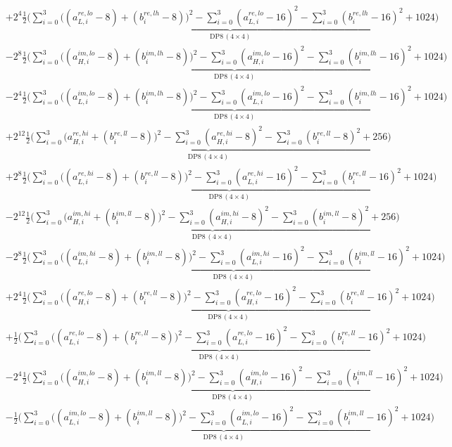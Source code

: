 \documentclass[fleqn]{article}
\newcommand{\DPop}[3]{\mathrm{DP#1}\,(#2\!\times\!#3)}
\begin{document}
\begin{align*}
  & + 2^{4}\underbrace{\tfrac12\Big(\sum_{i=0}^{3}\big((a_{L,i}^{re,lo}{-}8){+}(b_i^{re,lh}{-}8)\big)^2 - \sum_{i=0}^{3}(a_{L,i}^{re,lo}{-}16)^2 - \sum_{i=0}^{3}(b_i^{re,lh}{-}16)^2 + 1024\Big)}_{\DPop{8}{4}{4}} \\[0.35em]
  & - 2^{8}\underbrace{\tfrac12\Big(\sum_{i=0}^{3}\big((a_{H,i}^{im,lo}{-}8){+}(b_i^{im,lh}{-}8)\big)^2 - \sum_{i=0}^{3}(a_{H,i}^{im,lo}{-}16)^2 - \sum_{i=0}^{3}(b_i^{im,lh}{-}16)^2 + 1024\Big)}_{\DPop{8}{4}{4}} \\[0.35em]
  & - 2^{4}\underbrace{\tfrac12\Big(\sum_{i=0}^{3}\big((a_{L,i}^{im,lo}{-}8){+}(b_i^{im,lh}{-}8)\big)^2 - \sum_{i=0}^{3}(a_{L,i}^{im,lo}{-}16)^2 - \sum_{i=0}^{3}(b_i^{im,lh}{-}16)^2 + 1024\Big)}_{\DPop{8}{4}{4}} \\[0.35em]
  & + 2^{12}\underbrace{\tfrac12\Big(\sum_{i=0}^{3}\big(a_{H,i}^{re,hi}{+}(b_i^{re,ll}{-}8)\big)^2 - \sum_{i=0}^{3}(a_{H,i}^{re,hi}{-}8)^2 - \sum_{i=0}^{3}(b_i^{re,ll}{-}8)^2 + 256\Big)}_{\DPop{8}{4}{4}} \\[0.35em]
  & + 2^{8}\underbrace{\tfrac12\Big(\sum_{i=0}^{3}\big((a_{L,i}^{re,hi}{-}8){+}(b_i^{re,ll}{-}8)\big)^2 - \sum_{i=0}^{3}(a_{L,i}^{re,hi}{-}16)^2 - \sum_{i=0}^{3}(b_i^{re,ll}{-}16)^2 + 1024\Big)}_{\DPop{8}{4}{4}} \\[0.35em]
  & - 2^{12}\underbrace{\tfrac12\Big(\sum_{i=0}^{3}\big(a_{H,i}^{im,hi}{+}(b_i^{im,ll}{-}8)\big)^2 - \sum_{i=0}^{3}(a_{H,i}^{im,hi}{-}8)^2 - \sum_{i=0}^{3}(b_i^{im,ll}{-}8)^2 + 256\Big)}_{\DPop{8}{4}{4}} \\[0.35em]
  & - 2^{8}\underbrace{\tfrac12\Big(\sum_{i=0}^{3}\big((a_{L,i}^{im,hi}{-}8){+}(b_i^{im,ll}{-}8)\big)^2 - \sum_{i=0}^{3}(a_{L,i}^{im,hi}{-}16)^2 - \sum_{i=0}^{3}(b_i^{im,ll}{-}16)^2 + 1024\Big)}_{\DPop{8}{4}{4}} \\[0.35em]
  & + 2^{4}\underbrace{\tfrac12\Big(\sum_{i=0}^{3}\big((a_{H,i}^{re,lo}{-}8){+}(b_i^{re,ll}{-}8)\big)^2 - \sum_{i=0}^{3}(a_{H,i}^{re,lo}{-}16)^2 - \sum_{i=0}^{3}(b_i^{re,ll}{-}16)^2 + 1024\Big)}_{\DPop{8}{4}{4}} \\[0.35em]
  & + \underbrace{\tfrac12\Big(\sum_{i=0}^{3}\big((a_{L,i}^{re,lo}{-}8){+}(b_i^{re,ll}{-}8)\big)^2 - \sum_{i=0}^{3}(a_{L,i}^{re,lo}{-}16)^2 - \sum_{i=0}^{3}(b_i^{re,ll}{-}16)^2 + 1024\Big)}_{\DPop{8}{4}{4}} \\[0.35em]
  & - 2^{4}\underbrace{\tfrac12\Big(\sum_{i=0}^{3}\big((a_{H,i}^{im,lo}{-}8){+}(b_i^{im,ll}{-}8)\big)^2 - \sum_{i=0}^{3}(a_{H,i}^{im,lo}{-}16)^2 - \sum_{i=0}^{3}(b_i^{im,ll}{-}16)^2 + 1024\Big)}_{\DPop{8}{4}{4}} \\[0.35em]
  & - \underbrace{\tfrac12\Big(\sum_{i=0}^{3}\big((a_{L,i}^{im,lo}{-}8){+}(b_i^{im,ll}{-}8)\big)^2 - \sum_{i=0}^{3}(a_{L,i}^{im,lo}{-}16)^2 - \sum_{i=0}^{3}(b_i^{im,ll}{-}16)^2 + 1024\Big)}_{\DPop{8}{4}{4}}
\end{align*}
\end{document}
